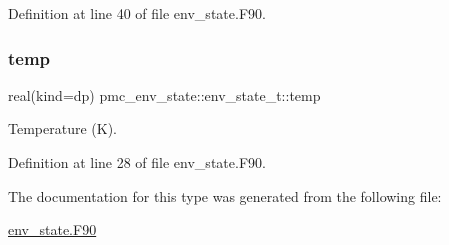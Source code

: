 Definition at line 40 of file env\+\_\+state.\+F90.

\mbox{\label{structpmc__env__state_1_1env__state__t_ad96036a96a84c324f24ff3ceb4874b0d}} 
\subsubsection{\texorpdfstring{temp}{temp}}
{\footnotesize\ttfamily real(kind=dp) pmc\+\_\+env\+\_\+state\+::env\+\_\+state\+\_\+t\+::temp}



Temperature (K). 



Definition at line 28 of file env\+\_\+state.\+F90.



The documentation for this type was generated from the following file\+:\begin{DoxyCompactItemize}
\item 
\mbox{\hyperlink{env__state_8_f90}{env\+\_\+state.\+F90}}\end{DoxyCompactItemize}
